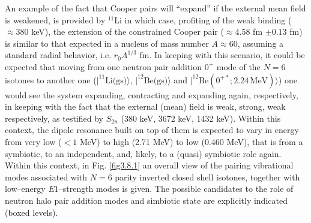   An example of the fact that Cooper pairs will ``expand'' if the external mean field is weakened, is provided by $^{11}$Li in which case, profiting of the weak binding ($\approx 380$ keV), the extension of the constrained Cooper  pair ($\approx 4.58 $ fm $\pm 0.13$ fm)   is similar to that expected in a nucleus of mass number $A\approx 60$, assuming a standard radial behavior, i.e. $r_0 A^{1/3}$ fm. In keeping with this scenario, it could be expected that moving from one neutron pair addition $0^+$ mode of the $N=6$ isotones to another one ($|^{11}\text{Li(gs)}\rangle$, $|^{12}\text{Be(gs)}\rangle$ and $|^{12}\text{Be}(0^{+*};2.24\,\text{MeV})\rangle$) one would see the system expanding, contracting and expanding again, respectively, in keeping with the fact that the external (mean) field is weak, strong, weak respectively, as testified by $S_{2n}$ (380 keV, 3672 keV, 1432 keV). Within this context,  the dipole  resonance  built on top of them is expected to vary in  energy from very low ($<1$ MeV) to high (2.71 MeV) to low (0.460 MeV), that is from a symbiotic, to an independent, and, likely, to a (quasi) symbiotic role again.
Within this context, in Fig. \ref{fig3.8.1} an overall view of the pairing vibrational modes associated with $N=6$ parity inverted closed shell isotones, together with low--energy $E1$--strength modes is given. The possible candidates to the role of neutron halo pair addition modes and simbiotic state are explicitly indicated (boxed levels).
